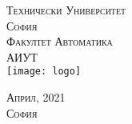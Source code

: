 \begin{titlepage}


	\vspace{1cm}
	\textsc{\LARGE Технически Университет\\
        София\\[0.3cm]
        	\vspace{1cm}
		\large Факултет Автоматика\\
        АИУТ}\\[0.5cm]
	\texttt{[image: logo]}

	\vfill\vfill\vfill %



        \textsc{Април, 2021\\
        София}




	\vfill %


\end{titlepage}
